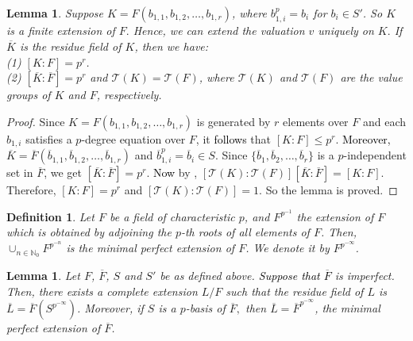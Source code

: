 \documentclass[times,10pt]{amsart}
\newcommand{\n}{\ensuremath{\infty}}
\newtheorem{defn}[thm]{Definition}%
\newtheorem{lemma}[thm]{Lemma}%
\begin{document}
{\begin{lemma}\label{np1l}
Suppose $K= F(b_{1,1}, b_{1,2}, \ldots, b_{1,r})$, where $ b^p_{1,i}=b_i$ for $b_i\in S'$. So $K$ is a finite extension of $F.$ Hence, we can extend the valuation $v$  uniquely on $K.$ If $\overline{K}$ is the residue field of $K$, then we have:\\(1) $[K:F]= p^r$.\\(2) $[\overline{K}:\overline{F}]=p^r$ and  $\mathcal{T}(K)=\mathcal{T}(F)$, where $ \mathcal{T}(K)$ and $\mathcal{T}(F)$ are the value groups of $K$ and $F$, respectively. 
\end{lemma}
    \begin{proof}
          Since $ K=F( b_{1,1},b_{1,2},\ldots , b_{1,r})$ is generated by $r$ elements over $F$ and each $b_{1,i}$ satisfies a $p$-degree  equation over $F$, it \textcolor{black}{follows} that  $ [K:F]\leq p^r.$  \textcolor{black}{Moreover,}  $\overline{K}= \overline{F}\left(\overline{b}_{1,1}, \overline{b}_{1,2},\ldots, \overline{b}_{1,r}\right) $ and $ \overline{b}_{1,i}^p= \overline{b}_i\in S.$ Since 
$\{\overline{b}_1, \overline{b}_2, \ldots , \overline{b}_r\}$ is a $p$-independent set in $\overline{F}$, we get 
$[\overline{K}:\overline{F}]=p^r.$   \textcolor{black}{Now} by \cite[Chapter 2, Theorem 11]{Sc}, $ [\mathcal{T}(K):\mathcal{T}(F)][\overline{K}:\overline{F}]=[K:F]$. Therefore, $ [K:F]=p^r$ and $[\mathcal{T}(K):\mathcal{T}(F)]=1.$ So the lemma is proved.
   \end{proof}

   
\begin{defn}\label{mpd}Let $F$ be a field of characteristic $p$, and $F^{p^{-1}}$ the extension of $F$ which is obtained by adjoining the $p$-th roots of all elements of $F$. Then, $\cup_{n\in \mathbb{N}_0} F^{p^{-n}}$ is the minimal perfect extension of $F$. We denote it by $F^{p^{-\n}}$. 
\end{defn}



   \begin{lemma}\label{np2l}
       Let $F$, $\overline{F}$, $S$ and $S'$ be as defined above. \textcolor{black}{Suppose  \textcolor{black}{that} $\overline{F}$}  is  imperfect. Then, there exists a complete extension   $L/F$  such that the residue field of $L$ is $\overline{L}= \overline{F}\left( S^{{p}^{-\infty}}\right)$.  Moreover, if $S$ is a $p$-basis of $\overline{F},$ then $ \overline{L}=\overline{F}^{p^{-\n}}$, the minimal perfect extension of $\overline{F}$. \end{lemma}

}
\end{document}
